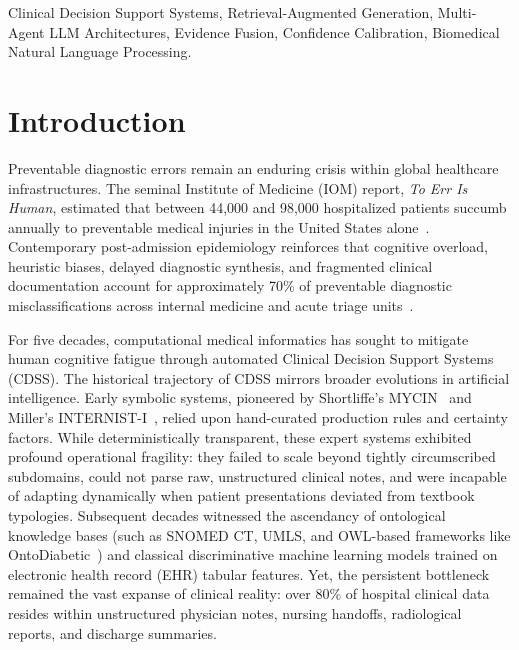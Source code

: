 \documentclass[conference]{IEEEtran}
\begin{document}
\begin{IEEEkeywords}
Clinical Decision Support Systems, Retrieval-Augmented Generation, Multi-Agent LLM Architectures, Evidence Fusion, Confidence Calibration, Biomedical Natural Language Processing.
\end{IEEEkeywords}

\section{Introduction}

Preventable diagnostic errors remain an enduring crisis within global healthcare infrastructures. The seminal Institute of Medicine (IOM) report, \textit{To Err Is Human}, estimated that between 44,000 and 98,000 hospitalized patients succumb annually to preventable medical injuries in the United States alone~\cite{kohn2000err}. Contemporary post-admission epidemiology reinforces that cognitive overload, heuristic biases, delayed diagnostic synthesis, and fragmented clinical documentation account for approximately 70\% of preventable diagnostic misclassifications across internal medicine and acute triage units~\cite{ohta2019causes}. 

For five decades, computational medical informatics has sought to mitigate human cognitive fatigue through automated Clinical Decision Support Systems (CDSS). The historical trajectory of CDSS mirrors broader evolutions in artificial intelligence. Early symbolic systems, pioneered by Shortliffe's MYCIN~\cite{shortliffe1976computer} and Miller's INTERNIST-I~\cite{miller1982internist}, relied upon hand-curated production rules and certainty factors. While deterministically transparent, these expert systems exhibited profound operational fragility: they failed to scale beyond tightly circumscribed subdomains, could not parse raw, unstructured clinical notes, and were incapable of adapting dynamically when patient presentations deviated from textbook typologies. Subsequent decades witnessed the ascendancy of ontological knowledge bases (such as SNOMED CT, UMLS, and OWL-based frameworks like OntoDiabetic~\cite{sherimon2016ontodiabetic}) and classical discriminative machine learning models trained on electronic health record (EHR) tabular features. Yet, the persistent bottleneck remained the vast expanse of clinical reality: over 80\% of hospital clinical data resides within unstructured physician notes, nursing handoffs, radiological reports, and discharge summaries.
\end{document}
